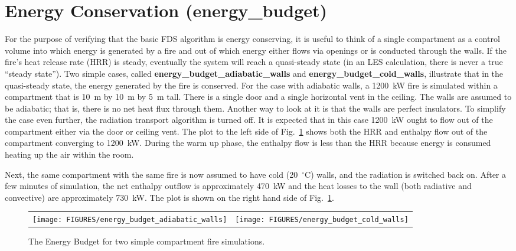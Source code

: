 \documentclass[11pt]{book}
\begin{document}
\clearpage

\section{Energy Conservation (\texorpdfstring{{\bf energy\_budget}}{energy\_budget})}

For the purpose of verifying that the basic FDS algorithm is energy conserving, it is useful to think of a single compartment as
a control volume into which energy is generated by a fire and out of which energy either flows via openings or is conducted
through the walls. If the fire's heat release rate (HRR) is steady, eventually the system will reach a quasi-steady state (in an LES
calculation, there is never a true ``steady state''). Two simple cases, called {\bf energy\_budget\_adiabatic\_walls} and
{\bf energy\_budget\_cold\_walls}, illustrate that in the quasi-steady state, the energy generated by the fire is conserved. For the
case with adiabatic walls, a 1200~kW fire is simulated within a compartment that is 10~m by 10~m by 5~m tall. There is a single
door and a single horizontal vent in the ceiling. The walls are assumed to be adiabatic; that is, there is no net heat flux through
them. Another way to look at it is that the walls are perfect insulators. To simplify the case even further, the radiation
transport algorithm is turned off. It is expected that in this case 1200~kW ought to flow out of the compartment either via the
door or ceiling vent. The plot to the left side of Fig.~\ref{energy_budget} shows both the HRR and enthalpy flow out of the compartment
converging to 1200~kW. During the warm up phase, the enthalpy flow is less than the HRR because energy is consumed heating
up the air within the room.

Next, the same compartment with the same fire is now assumed to have cold (20~$^\circ$C) walls, and the radiation is switched
back on. After a few minutes of simulation, the net enthalpy outflow is approximately 470~kW and the heat losses to the
wall (both radiative and convective) are approximately 730~kW. The plot is shown on the right hand side of Fig.~\ref{energy_budget}.

\begin{figure}[ht]
\begin{tabular*}{\textwidth}{lr}
\texttt{[image: FIGURES/energy\_budget\_adiabatic\_walls]} &
\texttt{[image: FIGURES/energy\_budget\_cold\_walls]}
\end{tabular*}
\caption[The energy budget cases.]{The Energy Budget for two simple compartment fire simulations.}
\label{energy_budget}
\end{figure}
\end{document}
